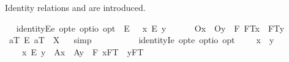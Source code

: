 \begin{isabellebody}
{}
%
\endisatagproof
{\isafoldproof}%
%
\isadelimproof
%
\endisadelimproof
%
\begin{isamarkuptext}%
Identity relations  and \isa{\isactrlbold {\isacharequal}} are introduced.%
\end{isamarkuptext}%
\isamarkuptrue%
\ \isamarkupfalse%
\ identityE{\isacharcolon}{\isacharcolon}{\isachardoublequoteopen}e\ opt{\isasymRightarrow}e\ opt{\isasymRightarrow}io\ opt{\isachardoublequoteclose}\ {\isacharparenleft}\ {\isachardoublequoteopen}\isactrlbold {\isacharequal}\isactrlsub E{\isachardoublequoteclose}\ {}{}{\isacharparenright}\ \ {\isachardoublequoteopen}x\ \isactrlbold {\isacharequal}\isactrlsub E\ y\ {\isasymequiv}\ \isanewline
\ \ \ \ {\isasymlparr}O{\isacharbang}{\isacharcomma}x{\isasymrparr}\ \isactrlbold {\isasymand}\ {\isasymlparr}O{\isacharbang}{\isacharcomma}y{\isasymrparr}\ \isactrlbold {\isasymand}\ \isactrlbold {\isasymbox}{\isacharparenleft}\isactrlbold {\isasymforall}F{\isachardot}\ {\isasymlparr}F\isactrlsup T{\isacharcomma}x{\isasymrparr}\ \isactrlbold {\isasymequiv}\ {\isasymlparr}F\isactrlsup T{\isacharcomma}y{\isasymrparr}{\isacharparenright}{\isachardoublequoteclose}\isanewline
\isanewline
\ \isamarkupfalse%
\ {\isachardoublequoteopen}a\isactrlsup T\ \isactrlbold {\isacharequal}\isactrlsub E\ a\isactrlsup T\ {\isacharequal}\ X{\isachardoublequoteclose}%
\isadelimproof
\ %
\endisadelimproof
%
\isatagproof
{}\isamarkupfalse%
\ simp\ \isamarkupfalse%
\ \ \ \ \ \ %
%
\endisatagproof
{\isafoldproof}%
%
\isadelimproof
%
\endisadelimproof
%
\isamarkuptrue%
\ \isamarkupfalse%
\ identityI{\isacharcolon}{\isacharcolon}{\isachardoublequoteopen}e\ opt{\isasymRightarrow}e\ opt{\isasymRightarrow}io\ opt{\isachardoublequoteclose}\ {\isacharparenleft}\ {\isachardoublequoteopen}\isactrlbold {\isacharequal}{\isachardoublequoteclose}\ {}{}{\isacharparenright}\ \ {\isachardoublequoteopen}x\ \isactrlbold {\isacharequal}\ y\ {\isasymequiv}\ \isanewline
\ \ \ \ x\ \isactrlbold {\isacharequal}\isactrlsub E\ y\ \isactrlbold {\isasymor}\ {\isacharparenleft}{\isasymlparr}A{\isacharbang}{\isacharcomma}x{\isasymrparr}\ \isactrlbold {\isasymand}\ {\isasymlparr}A{\isacharbang}{\isacharcomma}y{\isasymrparr}\ \isactrlbold {\isasymand}\ \isactrlbold {\isasymbox}{\isacharparenleft}\isactrlbold {\isasymforall}F{\isachardot}\ {\isasymlbrace}x{\isacharcomma}F\isactrlsup T{\isasymrbrace}\ \isactrlbold {\isasymequiv}\ {\isasymlbrace}y{\isacharcomma}F\isactrlsup T{\isasymrbrace}{\isacharparenright}{\isacharparenright}{\isachardoublequoteclose}\isanewline

\end{isabellebody}
